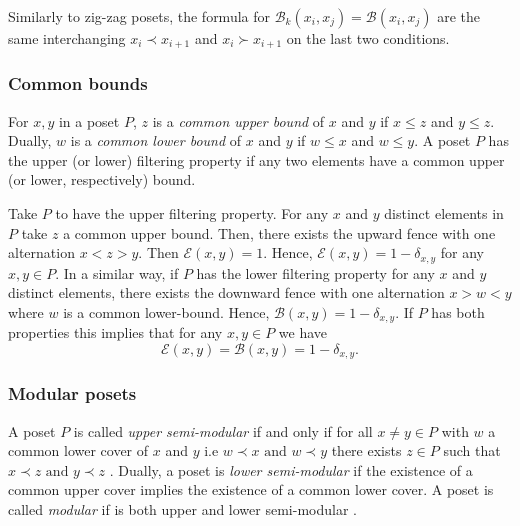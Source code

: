 \documentclass{article}[12pt]
\theoremstyle{exampstyle}
\theoremstyle{remark}
\newcommand{\B}{\mathcal{B}}
\newcommand{\E}{\mathcal{E}}
\begin{document}
Similarly to zig-zag posets, the formula for $ \B_k(x_i,x_j) = \B(x_i,x_j)$ are the same interchanging $x_i \prec x_{i+1}$ and $x_i \succ x_{i+1}$ on the last two conditions.

\subsubsection*{Common bounds}

For $x,y$ in a poset $P$, $z$ is a \textit{common upper bound} of $x$ and $y$ if $x \leq z$ and $y \leq z$. Dually, $w$  is a \textit{common lower bound} of $x$ and $y$ if $w \leq x$ and $w \leq y$. A poset $P$ has the upper (or lower) filtering property if any two elements have a common upper (or lower, respectively) bound. 

Take $P$ to have the upper filtering property. For any $x$ and $y$ distinct elements in $P$ take $z$ a common upper bound. Then, there exists the upward fence with one alternation $x < z > y$. Then $\E(x,y) = 1$. Hence, $\E(x,y) = 1 - \delta_{x,y}$ for any $x,y \in P$. In a similar way, if $P$ has the lower filtering property  for any $x$ and $y$ distinct elements, there exists the downward fence with one alternation $x > w < y$ where $w$ is a common lower-bound. Hence, $\B(x,y) = 1 - \delta_{x,y}$. If $P$ has both properties this implies that for any $x,y \in P$ we have  \[\E(x,y) = \B(x,y) = 1 - \delta_{x,y}.\]




\subsubsection*{Modular posets}
 
A poset $P$ is called \textit{upper semi-modular} if and only if for all $x \neq y \in P$ with $w$ a common lower cover of $x$ and $y$ i.e $w \prec x \text{ and } w \prec y$ there exists $z \in P$ such that $x \prec z \text{ and } y \prec z$ . Dually, a poset is \textit{lower semi-modular} if the existence of a common upper cover implies the existence of a common lower cover. A poset is called \textit{modular} if is both upper and lower semi-modular \cite{monjardet}.
\end{document}
